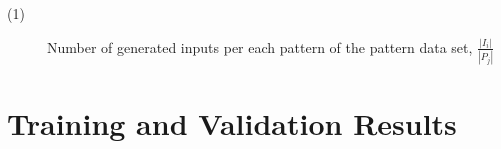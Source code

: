 \documentclass[anon]{CI}
\begin{document}
	
	\begin{description}
		\item [(1)] Number of generated inputs per each pattern of the pattern data set, $\frac{\left|I_i\right|}{\left|P_j\right|}$
		\end {description}
		
		\section{Training and Validation Results}\label{AppD}
		
		
		\begin{table}[H]
			\centering
			\def\arraystretch{1.5}
			\scriptsize
			\begin{tabular}{ccccc}
				

\end{tabular}
\end{table}
\end{document}
